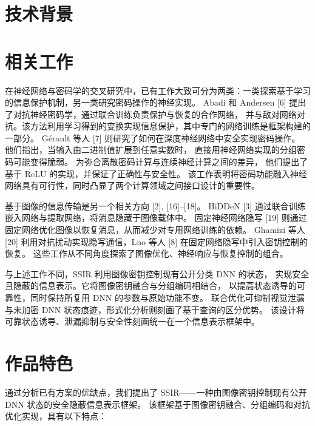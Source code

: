 \section{技术背景}


\section{相关工作}
在神经网络与密码学的交叉研究中，已有工作大致可分为两类：一类探索基于学习的信息保护机制，另一类研究密码操作的神经实现。
Abadi 和 Andersen [6] 提出了对抗神经密码学，通过联合训练负责保护与恢复的合作网络，
并与敌对网络对抗。该方法利用学习得到的变换实现信息保护，其中专门的网络训练是框架构建的一部分。
Gérault 等人 [7] 则研究了如何在深度神经网络中安全实现密码操作。
他们指出，当输入由二进制值扩展到任意实数时，
直接用神经网络实现的分组密码可能变得脆弱。
为弥合离散密码计算与连续神经计算之间的差异，
他们提出了基于 ReLU 的实现，并保证了正确性与安全性。
该工作表明将密码功能融入神经网络具有可行性，同时凸显了两个计算领域之间接口设计的重要性。

基于图像的信息传输是另一个相关方向 [2], [16]–[18]。
HiDDeN [3] 通过联合训练嵌入网络与提取网络，将消息隐藏于图像载体中。
固定神经网络隐写 [19] 则通过固定网络优化图像以恢复消息，从而减少对专用网络训练的依赖。
Ghamizi 等人 [20] 利用对抗扰动实现隐写通信，Luo 等人 [8] 在固定网络隐写中引入密钥控制的恢复。
这些工作从不同角度探索了图像优化、神经响应与恢复控制的组合。

与上述工作不同，SSIR 利用图像密钥控制现有公开分类 DNN 的状态，
实现安全且隐蔽的信息表示。它将图像密钥融合与分组编码相结合，
以提高状态诱导的可靠性，同时保持所复用 DNN 的参数与原始功能不变。
联合优化可抑制视觉泄漏与未加密 DNN 状态痕迹，形式化分析则刻画了基于查询的区分优势。
该设计将可靠状态诱导、泄漏抑制与安全性刻画统一在一个信息表示框架中。
\section{作品特色}
通过分析已有方案的优缺点，我们提出了 SSIR——一种由图像密钥控制现有公开 DNN 状态的安全隐蔽信息表示框架。
该框架基于图像密钥融合、分组编码和对抗优化实现，具有以下特点：

